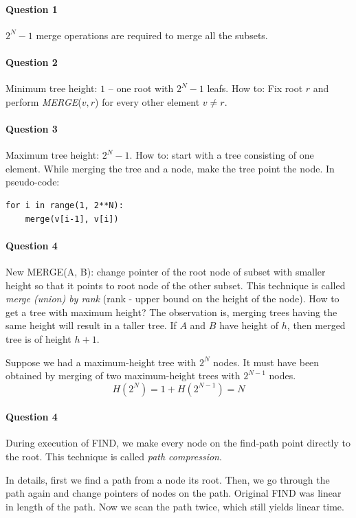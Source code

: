 \paragraph{Question 1}
$2^N-1$ merge operations are required to merge all the subsets.

\paragraph{Question 2}
Minimum tree height: $1$ – one root with $2^N - 1$ leafs. 
How to: Fix root $r$ and perform \emph{MERGE}($v, r$) for every other element $v \neq r$.

\paragraph{Question 3}
Maximum tree height: $2^N -1$.
How to: start with a tree consisting of one element.
While merging the tree and a node, make the tree point the node.
In pseudo-code: 
\begin{verbatim}
for i in range(1, 2**N):
    merge(v[i-1], v[i])
\end{verbatim}


\paragraph{Question 4}
New MERGE(A, B): change pointer of the root node of subset with smaller height so that it points to root node of the other subset. 
This technique is called \emph{merge (union) by rank} (rank - upper bound on the height of the node).
How to get a tree with maximum height?
The observation is, merging trees having the same height will result in a taller tree.
If $A$ and $B$ have height of $h$, then merged tree is of height $h+1$.

Suppose we had a maximum-height tree with $2^N$ nodes.
It must have been obtained by merging of two maximum-height trees with $2^{N-1}$ nodes.
\begin{equation*}
    H(2^N) = 1 + H(2^{N-1}) = N
\end{equation*}


\paragraph{Question 4}
During execution of FIND, we make every node on the find-path point directly to the root.
This technique is called \emph{path compression}.

In details, first we find a path from a node its root. 
Then, we go through the path again and change pointers of nodes on the path.
Original FIND was linear in length of the path.
Now we scan the path twice, which still yields linear time.



